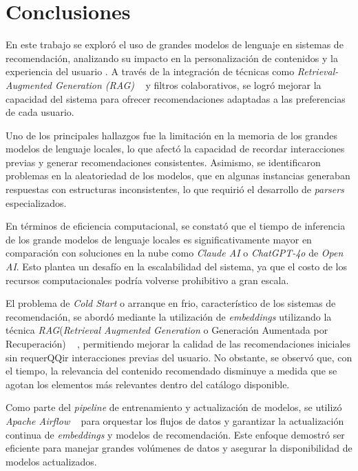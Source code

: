 \documentclass[11pt,a4paper,twoside]{thesis}
\begin{document}
\chapter{Conclusiones}

En este trabajo se exploró el uso de grandes modelos de lenguaje en sistemas de recomendación, analizando su impacto en la personalización de contenidos y la experiencia del usuario \cite{chatrec}. A través de la integración de técnicas como \textit{Retrieval-Augmented Generation (RAG)} ~\cite{rag} y filtros colaborativos, se logró mejorar la capacidad del sistema para ofrecer recomendaciones adaptadas a las preferencias de cada usuario.

Uno de los principales hallazgos fue la limitación en la memoria de los grandes modelos de lenguaje locales, lo que afectó la capacidad de recordar interacciones previas y generar recomendaciones consistentes. Asimismo, se identificaron problemas en la aleatoriedad de los modelos, que en algunas instancias generaban respuestas con estructuras inconsistentes, lo que requirió el desarrollo de \textit{parsers} especializados.

En términos de eficiencia computacional, se constató que el tiempo de inferencia de los grande modelos de lenguaje locales es significativamente mayor en comparación con soluciones en la nube como \textit{Claude AI} o \textit{ChatGPT-4o } de \textit{Open AI}. Esto plantea un desafío en la escalabilidad del sistema, ya que el costo de los recursos computacionales podría volverse prohibitivo a gran escala.

El problema de \textit{Cold Start} o arranque en frio, característico de los sistemas de recomendación, se abordó mediante la utilización de \textit{embeddings} utilizando la técnica \textit{RAG}(\textit{Retrieval Augmented Generation} o Generación Aumentada por Recuperación) ~\cite{rag} , permitiendo mejorar la calidad de las recomendaciones iniciales sin requerQQir interacciones previas del usuario. No obstante, se observó que, con el tiempo, la relevancia del contenido recomendado disminuye a medida que se agotan los elementos más relevantes dentro del catálogo disponible.

Como parte del \textit{pipeline} de entrenamiento y actualización de modelos, se utilizó \textit{Apache Airflow} ~\cite{apache-airflow} para orquestar los flujos de datos y garantizar la actualización continua de \textit{embeddings} y modelos de recomendación. Este enfoque demostró ser eficiente para manejar grandes volúmenes de datos y asegurar la disponibilidad de modelos actualizados.
\end{document}
